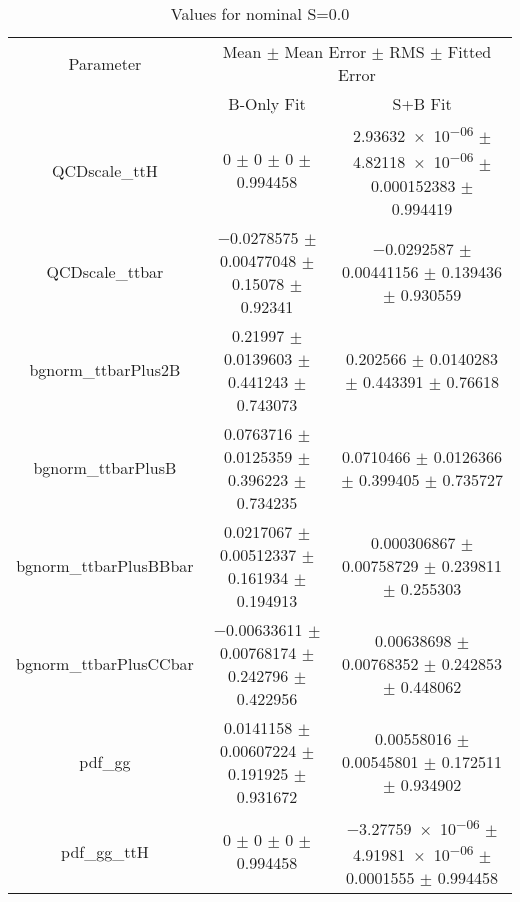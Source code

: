 \begin{table}
\centering
\caption{Values for nominal S=0.0}
\begin{tabular}{ccc}
\toprule
Parameter & \multicolumn{2}{c}{Mean $\pm$ Mean Error $\pm$ RMS $\pm$ Fitted Error}\\
 & B-Only Fit & S+B Fit\\
\midrule
QCDscale\_ttH & \num{0} $\pm$ \num{0} $\pm$ \num{0} $\pm$ \num{0.994458} & \num{2.93632e-06} $\pm$ \num{4.82118e-06} $\pm$ \num{0.000152383} $\pm$ \num{0.994419}\\
QCDscale\_ttbar & \num{-0.0278575} $\pm$ \num{0.00477048} $\pm$ \num{0.15078} $\pm$ \num{0.92341} & \num{-0.0292587} $\pm$ \num{0.00441156} $\pm$ \num{0.139436} $\pm$ \num{0.930559}\\
bgnorm\_ttbarPlus2B & \num{0.21997} $\pm$ \num{0.0139603} $\pm$ \num{0.441243} $\pm$ \num{0.743073} & \num{0.202566} $\pm$ \num{0.0140283} $\pm$ \num{0.443391} $\pm$ \num{0.76618}\\
bgnorm\_ttbarPlusB & \num{0.0763716} $\pm$ \num{0.0125359} $\pm$ \num{0.396223} $\pm$ \num{0.734235} & \num{0.0710466} $\pm$ \num{0.0126366} $\pm$ \num{0.399405} $\pm$ \num{0.735727}\\
bgnorm\_ttbarPlusBBbar & \num{0.0217067} $\pm$ \num{0.00512337} $\pm$ \num{0.161934} $\pm$ \num{0.194913} & \num{0.000306867} $\pm$ \num{0.00758729} $\pm$ \num{0.239811} $\pm$ \num{0.255303}\\
bgnorm\_ttbarPlusCCbar & \num{-0.00633611} $\pm$ \num{0.00768174} $\pm$ \num{0.242796} $\pm$ \num{0.422956} & \num{0.00638698} $\pm$ \num{0.00768352} $\pm$ \num{0.242853} $\pm$ \num{0.448062}\\
pdf\_gg & \num{0.0141158} $\pm$ \num{0.00607224} $\pm$ \num{0.191925} $\pm$ \num{0.931672} & \num{0.00558016} $\pm$ \num{0.00545801} $\pm$ \num{0.172511} $\pm$ \num{0.934902}\\
pdf\_gg\_ttH & \num{0} $\pm$ \num{0} $\pm$ \num{0} $\pm$ \num{0.994458} & \num{-3.27759e-06} $\pm$ \num{4.91981e-06} $\pm$ \num{0.0001555} $\pm$ \num{0.994458}\\
\bottomrule
\end{tabular}
\end{table}